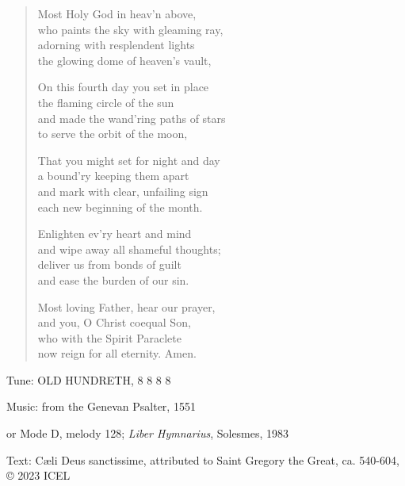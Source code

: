 \hymn

\begin{verse}
Most Holy God in heav’n above,\\
who paints the sky with gleaming ray,\\
adorning with resplendent lights\\
the glowing dome of heaven’s vault,

On this fourth day you set in place\\
the flaming circle of the sun\\
and made the wand’ring paths of stars\\
to serve the orbit of the moon,

That you might set for night and day\\
a bound’ry keeping them apart\\
and mark with clear, unfailing sign\\
each new beginning of the month.

Enlighten ev’ry heart and mind\\
and wipe away all shameful thoughts;\\
deliver us from bonds of guilt\\
and ease the burden of our sin.

Most loving Father, hear our prayer,\\
and you, O Christ coequal Son,\\
who with the Spirit Paraclete\\
now reign for all eternity. Amen.
\end{verse}

\begin{hymnsource}
Tune: OLD HUNDRETH, 8 8 8 8

Music: from the Genevan Psalter, 1551

or Mode D, melody 128; \emph{Liber Hymnarius}, Solesmes, 1983

Text: Cæli Deus sanctissime, attributed to Saint Gregory the Great, ca. 540-604, © 2023 ICEL
\end{hymnsource}